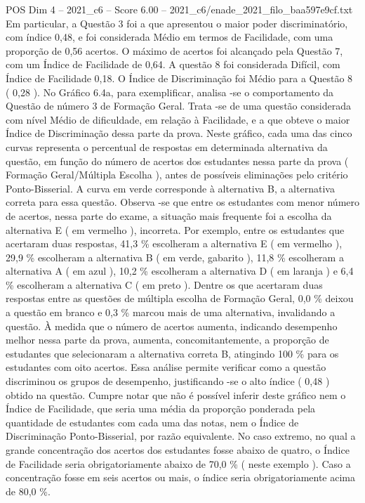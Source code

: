 \begin{textsample}{POS Dim 4 – 2021\_c6 – Score 6.00 – 2021\_c6/enade\_2021\_filo\_baa597e9cf.txt}
Em particular, a Questão 3 foi a que apresentou o maior poder discriminatório, com índice 0,48, e foi considerada Médio em termos de Facilidade, com uma proporção de 0,56 acertos.
O máximo de acertos foi alcançado pela Questão 7, com um Índice de Facilidade de 0,64.
A questão 8 foi considerada Difícil, com Índice de Facilidade 0,18.
O Índice de Discriminação foi Médio para a Questão 8 ( 0,28 ).
No Gráfico 6.4a, para exemplificar, analisa -se o comportamento da Questão de número 3 de Formação Geral.
Trata -se de uma questão considerada com nível Médio de dificuldade, em relação à Facilidade, e a que obteve o maior Índice de Discriminação dessa parte da prova.
Neste gráfico, cada uma das cinco curvas representa o percentual de respostas em determinada alternativa da questão, em função do número de acertos dos estudantes nessa parte da prova ( Formação Geral/Múltipla Escolha ), antes de possíveis eliminações pelo critério Ponto-Bisserial.
A curva em verde corresponde à alternativa B, a alternativa correta para essa questão.
Observa -se que entre os estudantes com menor número de acertos, nessa parte do exame, a situação mais frequente foi a escolha da alternativa E ( em vermelho ), incorreta.
Por exemplo, entre os estudantes que acertaram duas respostas, 41,3 \% escolheram a alternativa E ( em vermelho ), 29,9 \% escolheram a alternativa B ( em verde, gabarito ), 11,8 \% escolheram a alternativa A ( em azul ), 10,2 \% escolheram a alternativa D ( em laranja ) e 6,4 \% escolheram a alternativa C ( em preto ).
Dentre os que acertaram duas respostas entre as questões de múltipla escolha de Formação Geral, 0,0 \% deixou a questão em branco e 0,3 \% marcou mais de uma alternativa, invalidando a questão.
À medida que o número de acertos aumenta, indicando desempenho melhor nessa parte da prova, aumenta, concomitantemente, a proporção de estudantes que selecionaram a alternativa correta B, atingindo 100 \% para os estudantes com oito acertos.
Essa análise permite verificar como a questão discriminou os grupos de desempenho, justificando -se o alto índice ( 0,48 ) obtido na questão.
Cumpre notar que não é possível inferir deste gráfico nem o Índice de Facilidade, que seria uma média da proporção ponderada pela quantidade de estudantes com cada uma das notas, nem o Índice de Discriminação Ponto-Bisserial, por razão equivalente.
No caso extremo, no qual a grande concentração dos acertos dos estudantes fosse abaixo de quatro, o Índice de Facilidade seria obrigatoriamente abaixo de 70,0 \% ( neste exemplo ).
Caso a concentração fosse em seis acertos ou mais, o índice seria obrigatoriamente acima de 80,0 \%.

\end{textsample}
